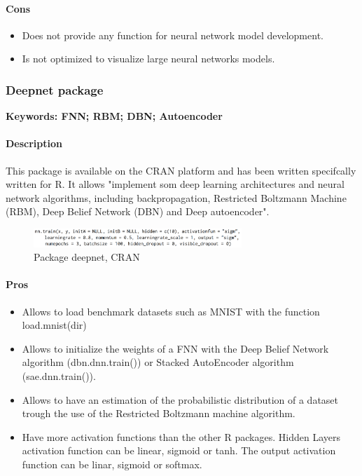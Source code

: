 \documentclass[6pt,letter]{article}\usepackage[]{graphicx}\usepackage[]{color}
\begin{document}
\paragraph{Cons}
\begin{itemize}
\item Does not provide any function for neural network model development.
\item Is not optimized to visualize large neural networks models.
\end{itemize}






\subsubsection{Deepnet package}
\textbf{Keywords: FNN; RBM; DBN; Autoencoder}
\paragraph{Description}
This package is available on the CRAN platform and has been written specifcally written for R. It allows "implement som deep learning architectures and neural network algorithms, including backpropagation, Restricted Boltzmann Machine (RBM), Deep Belief Network (DBN) and Deep autoencoder".
\begin{figure}[h]
    \centering
    \includegraphics[width=0.7\textwidth]{figure/deepnet_package.png}
     \caption{Package deepnet, CRAN}
\end{figure}
\paragraph{Pros}
\begin{itemize}
\item Allows to load benchmark datasets such as MNIST with the function load.mnist(dir)
\item Allows to initialize the weights of a FNN with the Deep Belief Network algorithm (dbn.dnn.train()) or Stacked AutoEncoder algorithm (sae.dnn.train()).
\item Allows to have an estimation of the probabilistic distribution of a dataset trough the use of the Restricted Boltzmann machine algorithm.
\item Have more activation functions than the other R packages. Hidden Layers activation function can be linear, sigmoid or tanh. The output activation function can be linar, sigmoid or softmax.
\end{itemize}
\end{document}
